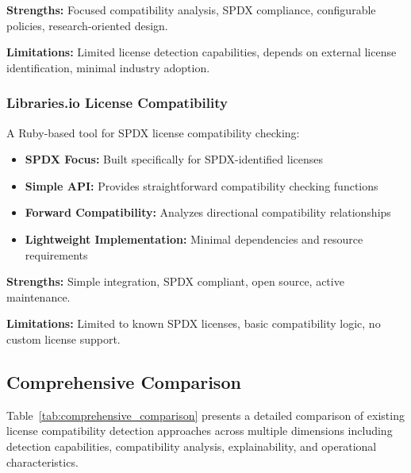 \documentclass[9pt,twocolumn]{article}
\begin{document}
\textbf{Strengths:} Focused compatibility analysis, SPDX compliance, configurable policies, research-oriented design.

\textbf{Limitations:} Limited license detection capabilities, depends on external license identification, minimal industry adoption.

\subsubsection{Libraries.io License Compatibility}
A Ruby-based tool for SPDX license compatibility checking:

\begin{itemize}
    \item \textbf{SPDX Focus:} Built specifically for SPDX-identified licenses
    \item \textbf{Simple API:} Provides straightforward compatibility checking functions
    \item \textbf{Forward Compatibility:} Analyzes directional compatibility relationships
    \item \textbf{Lightweight Implementation:} Minimal dependencies and resource requirements
\end{itemize}

\textbf{Strengths:} Simple integration, SPDX compliant, open source, active maintenance.

\textbf{Limitations:} Limited to known SPDX licenses, basic compatibility logic, no custom license support.

\subsection{Comprehensive Comparison}

Table~\ref{tab:comprehensive_comparison} presents a detailed comparison of existing license compatibility detection approaches across multiple dimensions including detection capabilities, compatibility analysis, explainability, and operational characteristics.
\end{document}
